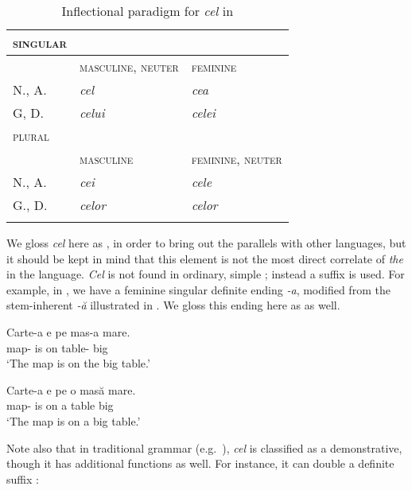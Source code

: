 \documentclass[output=paper
,modfonts
,nonflat]{langsci/langscibook}
\begin{document}
\begin{table}[bh]
\caption{Inflectional paradigm for \textit{cel} in }
\label{tab:coppockstrand:3}
\begin{tabularx}{0.75\textwidth}{ l X X }
\lsptoprule
\textsc{singular}\\\midrule
& \textsc{masculine}, \textsc{neuter} & \textsc{feminine}\\\midrule
N., A. & \textit{cel} & \textit{cea}\\
G, D. & \textit{celui} & \textit{celei}\\\midrule
\textsc{plural}\\\midrule
& \textsc{masculine} & \textsc{feminine}, \textsc{neuter}\\\midrule
N., A. & \textit{cei} & \textit{cele}\\
G., D. & \textit{celor} & \textit{celor}\\\lspbottomrule
\end{tabularx}
\end{table}


We gloss \textit{cel} here as , in order to bring out the parallels with other  languages, but it should be kept in mind that this element is not the most direct correlate of  \textit{the} in the language. 
\textit{Cel} is not found in ordinary, simple ; instead a suffix is used. For example, in , we have a feminine singular definite ending \textit{-a}, modified from the stem-inherent \textit{-ă} illustrated in . We gloss this ending here as  as well.

\ea \label{ex:coppockstrand:30}
\begin{xlist}
\ex \label{ex:coppockstrand:30a}
\gll Carte-a e pe mas-a mare.\\
map- is on table- big\\
\glt `The map is on the big table.'

\ex \label{ex:coppockstrand:30b}
\gll Carte-a e pe o masă mare.\\
map- is on a table big\\
\glt `The map is on a big table.'
\end{xlist}
\z

Note also that in traditional grammar (e.g.\ \citealt{Cojocaru2003}), \textit{cel} is classified as a demonstrative, though it has additional functions as well. For instance, it can double a definite suffix \citep{Alexiadou2014}:
\end{document}
